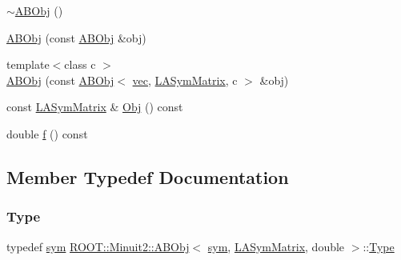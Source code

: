 \begin{DoxyCompactItemize}
\item 
\mbox{\hyperlink{classROOT_1_1Minuit2_1_1ABObj_3_01sym_00_01LASymMatrix_00_01double_01_4_a42b0b36ac55162609ddc385b3631cb6b}{$\sim$\+A\+B\+Obj}} ()
\item 
\mbox{\hyperlink{classROOT_1_1Minuit2_1_1ABObj_3_01sym_00_01LASymMatrix_00_01double_01_4_ad172181f07e897f45d1fe0d7954bb03b}{A\+B\+Obj}} (const \mbox{\hyperlink{classROOT_1_1Minuit2_1_1ABObj}{A\+B\+Obj}} \&obj)
\item 
{\footnotesize template$<$class c $>$ }\\\mbox{\hyperlink{classROOT_1_1Minuit2_1_1ABObj_3_01sym_00_01LASymMatrix_00_01double_01_4_a2632d99f281d85d56d8cd843e58eeac8}{A\+B\+Obj}} (const \mbox{\hyperlink{classROOT_1_1Minuit2_1_1ABObj}{A\+B\+Obj}}$<$ \mbox{\hyperlink{classROOT_1_1Minuit2_1_1vec}{vec}}, \mbox{\hyperlink{classROOT_1_1Minuit2_1_1LASymMatrix}{L\+A\+Sym\+Matrix}}, c $>$ \&obj)
\item 
const \mbox{\hyperlink{classROOT_1_1Minuit2_1_1LASymMatrix}{L\+A\+Sym\+Matrix}} \& \mbox{\hyperlink{classROOT_1_1Minuit2_1_1ABObj_3_01sym_00_01LASymMatrix_00_01double_01_4_a8caec6ce565f8d3729c663088d40233e}{Obj}} () const
\item 
double \mbox{\hyperlink{classROOT_1_1Minuit2_1_1ABObj_3_01sym_00_01LASymMatrix_00_01double_01_4_ad664e57b0a6720ab9c267c662c76b78f}{f}} () const
\end{DoxyCompactItemize}


\subsection{Member Typedef Documentation}
\mbox{\label{classROOT_1_1Minuit2_1_1ABObj_3_01sym_00_01LASymMatrix_00_01double_01_4_ac7186d69c32b1e8a607ae45125e869c0}} 
\subsubsection{\texorpdfstring{Type}{Type}\hspace{0.1cm}{\footnotesize\ttfamily [1/2]}}
{\footnotesize\ttfamily typedef \mbox{\hyperlink{classROOT_1_1Minuit2_1_1sym}{sym}} \mbox{\hyperlink{classROOT_1_1Minuit2_1_1ABObj}{R\+O\+O\+T\+::\+Minuit2\+::\+A\+B\+Obj}}$<$ \mbox{\hyperlink{classROOT_1_1Minuit2_1_1sym}{sym}}, \mbox{\hyperlink{classROOT_1_1Minuit2_1_1LASymMatrix}{L\+A\+Sym\+Matrix}}, double $>$\+::\mbox{\hyperlink{classROOT_1_1Minuit2_1_1ABObj_3_01sym_00_01LASymMatrix_00_01double_01_4_ac7186d69c32b1e8a607ae45125e869c0}{Type}}}

